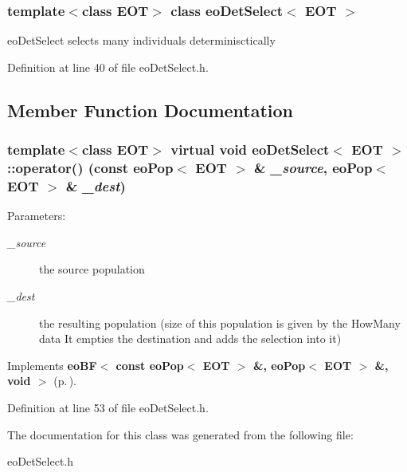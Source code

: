 \subsubsection*{template$<$class EOT$>$ class eo\-Det\-Select$<$ EOT $>$}

eo\-Det\-Select selects many individuals determinisctically 



Definition at line 40 of file eo\-Det\-Select.h.

\subsection{Member Function Documentation}
\subsubsection{\setlength{\rightskip}{0pt plus 5cm}template$<$class EOT$>$ virtual void {\bf eo\-Det\-Select}$<$ {\bf EOT} $>$::operator() (const {\bf eo\-Pop}$<$ {\bf EOT} $>$ \& {\em \_\-source}, {\bf eo\-Pop}$<$ {\bf EOT} $>$ \& {\em \_\-dest})\hspace{0.3cm}{\tt  [inline, virtual]}}\label{classeo_det_select_a1}


\begin{Desc}
\item[Parameters:]
\begin{description}
\item[{\em \_\-source}]the source population \item[{\em \_\-dest}]the resulting population (size of this population is given by the How\-Many data It empties the destination and adds the selection into it) \end{description}
\end{Desc}


Implements {\bf eo\-BF$<$ const eo\-Pop$<$ EOT $>$ \&, eo\-Pop$<$ EOT $>$ \&, void $>$} {\rm (p.\,\pageref{classeo_b_f_a1})}.

Definition at line 53 of file eo\-Det\-Select.h.

The documentation for this class was generated from the following file:\begin{CompactItemize}
\item 
eo\-Det\-Select.h\end{CompactItemize}
